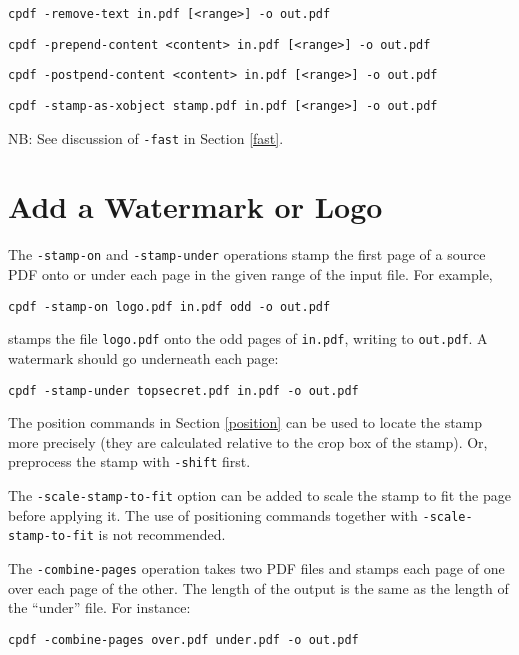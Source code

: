 \documentclass{book}
\begin{document}
\begin{framed}
  \vspace{1.5mm}
  \noindent\small\verb!cpdf -remove-text in.pdf [<range>] -o out.pdf!

  \vspace{1.5mm}
  \noindent\small\verb!cpdf -prepend-content <content> in.pdf [<range>] -o out.pdf!

  \vspace{1.5mm}
  \noindent\small\verb!cpdf -postpend-content <content> in.pdf [<range>] -o out.pdf!

  \vspace{1.5mm}
  \noindent\small\verb!cpdf -stamp-as-xobject stamp.pdf in.pdf [<range>] -o out.pdf!

  \vspace{1.5mm}
  \noindent\small NB: See discussion of \texttt{-fast} in Section \ref{fast}.
  \end{framed}

  \section{Add a Watermark or Logo}
  The \texttt{-stamp-on} and \texttt{-stamp-under} operations stamp the first
page of a source PDF onto or under each page in the given range of the input
file. For example,
  \begin{framed}
    \small\verb!cpdf -stamp-on logo.pdf in.pdf odd -o out.pdf!
  \end{framed}
\noindent stamps the file \texttt{logo.pdf} onto the odd pages of \texttt{in.pdf},
writing to \texttt{out.pdf}. A watermark should go underneath each page:
  \begin{framed}
    \small\verb!cpdf -stamp-under topsecret.pdf in.pdf -o out.pdf!
  \end{framed}

\noindent The position commands in Section \ref{position} can be used to locate the stamp more precisely (they are calculated relative to the crop box of the stamp). Or, preprocess the stamp with \texttt{-shift} first.

The \texttt{-scale-stamp-to-fit} option can be added to scale the stamp to fit the page before applying it. The use of positioning commands together with \texttt{-scale-stamp-to-fit} is not recommended.

  The \texttt{-combine-pages} operation takes two PDF files and stamps each
page of one over each page of the other. The length of the output is the same
as the length of the ``under'' file. For instance:
  \begin{framed}
    \small\verb!cpdf -combine-pages over.pdf under.pdf -o out.pdf!
  \end{framed}
\end{document}
